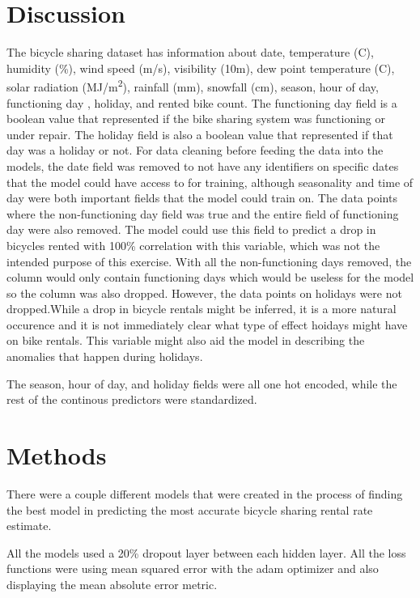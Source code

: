 \documentclass{article}
\begin{document}
\section{Discussion}
    The bicycle sharing dataset has information about date, 
    temperature (\degree C), humidity (\%), wind speed (m/s), 
    visibility (10m),  dew point temperature (\degree C), 
    solar radiation (MJ/m\textsuperscript{2}), 
    rainfall (mm), snowfall (cm), season, hour of day, functioning day , holiday, 
    and rented bike count.
    The functioning day field is a boolean value that represented if the bike 
    sharing system was functioning or under repair.
    The holiday field is also a boolean value that represented if that day was 
    a holiday or not.
    For data cleaning before feeding the data into the models, the date field was 
    removed to not have any identifiers on specific dates that the model could have 
    access to for training, although seasonality and time of day were both important fields
    that the model could train on. The data points where the non-functioning day field
    was true and the entire field of functioning day were also removed. The model could use this field to predict a drop in 
    bicycles rented with 100\% correlation with this variable, which was not the 
    intended purpose of this exercise. With all the non-functioning days removed, the column would 
    only contain functioning days which would be useless for the model so the column was also dropped. 
    However, the data points on holidays were not dropped.While a drop in bicycle rentals 
    might be inferred, it is a more natural occurence and it is not immediately clear what 
    type of effect hoidays might have on bike rentals. This variable might also aid the model 
    in describing the anomalies that happen during holidays.

    The season, hour of day, and holiday fields were all one hot encoded, while the rest of the 
    continous predictors were standardized.


\section{Methods}
    There were a couple different models that were created in the process of finding the best model in predicting the most accurate
    bicycle sharing rental rate estimate. 

    All the models used a 20\% dropout layer between each hidden layer. All the loss functions were 
    using mean squared error with the adam optimizer and also displaying the mean absolute error metric.
\end{document}
